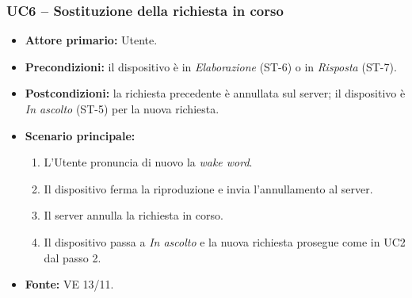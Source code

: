 \documentclass[12pt,a4paper]{article}
\newcommand{\tightlist}{\setlength{\itemsep}{1pt}\setlength{\parskip}{0pt}}
\begin{document}
\subsubsection{UC6 -- Sostituzione della richiesta in corso}
\begin{itemize}
\tightlist
\item \textbf{Attore primario:} Utente.
\item \textbf{Precondizioni:} il dispositivo è in \emph{Elaborazione} (ST-6) o in \emph{Risposta} (ST-7).
\item \textbf{Postcondizioni:} la richiesta precedente è annullata sul server; il dispositivo è \emph{In ascolto} (ST-5) per la nuova richiesta.
\item \textbf{Scenario principale:}
\begin{enumerate}
\tightlist
\item L'Utente pronuncia di nuovo la \emph{wake word}.
\item Il dispositivo ferma la riproduzione e invia l'annullamento al server.
\item Il server annulla la richiesta in corso.
\item Il dispositivo passa a \emph{In ascolto} e la nuova richiesta prosegue come in UC2 dal passo 2.
\end{enumerate}
\item \textbf{Fonte:} VE 13/11.
\end{itemize}
\end{document}
